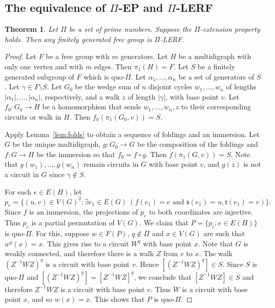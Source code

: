 \documentclass[10pt,a4paper]{amsart}
\newtheorem{theorem}{Theorem}[section]
\theoremstyle{definition}
\theoremstyle{definition}
\numberwithin{equation}{section}
\begin{document}
\subsection{The equivalence of $\Pi$-EP and $\Pi$-LERF}

\begin{theorem}\label{thm:EPtoLERF} Let $\Pi$ be a set of prime numbers. Suppose the $\Pi$-extension property holds. Then any finitely generated free group is $\Pi$-LERF.
\end{theorem}

\begin{proof} Let $F$ be a free group with $m$ generators. Let $H$ be a multidigraph with only one vertex and with $m$ edges. Then $\pi_1(H)=F$. Let $S$ be a finitely generated subgroup of $F$ which is quo-$\Pi$. Let $\alpha_1,\dots, \alpha_n$ be a set of generators of $S$. Let $\gamma\in F\setminus S$. Let $G_0$ be the wedge sum of $n$ disjoint cycles $w_1, \dots, w_n$ of lengths $|\alpha_1|, \dots, |\alpha_n|$, respectively, and a walk $z$ of length $|\gamma|$, with base point $v$. Let $f_0\colon G_0\to H$ be a homomorphism that sends $w_1,\dots, w_n, z$ to their corresponding circuits or walk in $H$. Then $f_0(\pi_1(G_0,v))=S$. 

Apply Lemma~\ref{lem:folds} to obtain a sequence of foldings and an immersion. Let $G$ be the unique multidigraph, $g\colon G_0\to G$ be the composition of the foldings and $f\colon G\to H$ be the immersion so that $f_0=f\circ g$. Then $f(\pi_1(G, v))=S$. Note that $g(w_1), \dots, g(w_n)$ remain circuits in $G$ with base point $v$, and $g(z)$ is not a circuit in $G$ since $\gamma\not\in S$. 

For each $e\in E(H)$, let
$$ p_e=\{(u,v)\in V(G)^2\colon \exists e_1\in E(G)\ (f(e_1)=e \mbox{ and } \mathsf{s}(e_1)=u, \mathsf{t}(e_1)=v)\}. $$
Since $f$ is an immersion, the projections of $p_e$ to both coordinates are injective. Thus $p_e$ is a partial permutation of $V(G)$. We claim that $P=\{p_e\colon e\in E(H)\}$ is quo-$\Pi$. For this, suppose $w\in F(P)$, $q\not\in \Pi$ and $x\in V(G)$ are such that $w^q(x)=x$. This gives rise to a circuit $W^q$ with base point $x$. Note that $G$ is weakly connected, and therefore there is a walk $Z$ from $v$ to $x$. The walk $(Z^{-1}WZ)^q$ is a circuit with base point $v$. Hence $[(Z^{-1}WZ)^q]\in S$. Since $S$ is quo-$\Pi$ and $[(Z^{-1}WZ)^q]=[Z^{-1}WZ]^q$, we conclude that $[Z^{-1}WZ]\in S$ and therefore $Z^{-1}WZ$ is a circuit with base point $v$. Thus $W$ is a circuit with base point $x$, and so $w(x)=x$. This shows that $P$ is quo-$\Pi$.


\end{proof}
\end{document}
